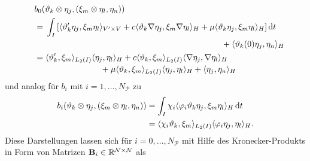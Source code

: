 \documentclass[../main.tex]{subfiles}
\begin{document}
\begin{align}
    &b_{0}(\theta_{k} \otimes \eta_{j}, (\xi_{m} \otimes \eta_{l}, \eta_{n}))
    \\\quad&=
    \begin{multlined}[t][.7\displaywidth]
        \int_{I} \left[ \skp{\theta_{k}' \eta_{j}}{\xi_{m} \eta_{l}}{V' \times V} + c \skp{\theta_{k} \grad \eta_{j}}{\xi_{m} \grad \eta_{l}}{H} + \mu \skp{\theta_{k} \eta_{j}}{\xi_{m} \eta_{l}}{H} \right] \diff t
        \\+ \skp{\theta_{k}(0) \eta_{j}}{\eta_{n}}{H}
    \end{multlined}
    \\\quad&=
    \begin{multlined}[t][.7\displaywidth]
        \skp{\theta_{k}'}{\xi_{m}}{L_{2}(I)} \skp{\eta_{j}}{\eta_{l}}{H} + c \skp{\theta_{k}}{\xi_{m}}{L_{2}(I)}\skp{\grad \eta_{j}}{\grad \eta_{l}}{H}
        \\+ \mu \skp{\theta_{k}}{\xi_{m}}{L_{2}(I)} \skp{\eta_{j}}{\eta_{l}}{H} + \skp{\eta_{j}}{\eta_{n}}{H}
    \end{multlined}
\end{align}
und analog für $b_{i}$ mit $i = 1, \dots, N_{\mathcal P}$ zu
\begin{align}
    b_{i}(\vartheta_{k} \otimes \eta_{j}, (\xi_{m} \otimes \eta_{l}, \eta_{n}))
    &= \int_{I} \chi_{i} \langle\varphi_{i} \vartheta_{k} \eta_{j},\xi_{m} \eta_{l}\rangle_{H} \mathop{}\!\mathrm{d} t
    \\&= \langle\chi_{i} \vartheta_{k},\xi_{m}\rangle_{L_{2}(I)} \langle\varphi_{i} \eta_{j},\eta_{l}\rangle_{H}.
\end{align}
Diese Darstellungen lassen sich für $i = 0, \dots, N_{\mathcal P}$ mit Hilfe des Kronecker-Produkts in Form von Matrizen $\mathbf{B}_{i} \in \mathbb{R}^{\mathcal N \times \mathcal N}$ als
\end{document}
